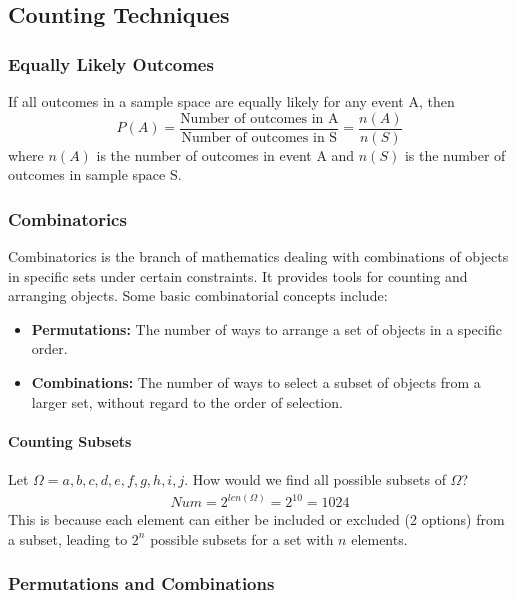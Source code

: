 \subsection{Counting Techniques}
\hrulefill

\subsubsection*{Equally Likely Outcomes}
If all outcomes in a sample space are equally likely for any event A, then
\begin{equation*}
    P(A) = \frac{\text{Number of outcomes in A}}{\text{Number of outcomes in S}} = \frac{n(A)}{n(S)}
\end{equation*}
where $n(A)$ is the number of outcomes in event A and $n(S)$ is the number of outcomes in sample space S.

\subsubsection*{Combinatorics}
Combinatorics is the branch of mathematics dealing with combinations of objects in specific sets under certain constraints. It provides tools for counting and arranging objects.
Some basic combinatorial concepts include:
\begin{itemize}
    \item \textbf{Permutations:} The number of ways to arrange a set of objects in a specific order.
    \item \textbf{Combinations:} The number of ways to select a subset of objects from a larger set, without regard to the order of selection.
\end{itemize}

\paragraph*{Counting Subsets}
Let $\Omega = { a, b, c, d, e, f, g, h , i, j }$. How would we find all possible subsets of $\Omega$?
\begin{align*}
    Num = 2^{len(\Omega)} = 2^{10} = 1024
\end{align*}
This is because each element can either be included or excluded (2 options) from a subset, leading to $2^{n}$ possible subsets for a set with $n$ elements.

\pagebreak

\subsubsection*{Permutations and Combinations}
